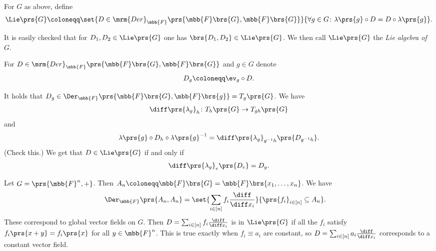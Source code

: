 \documentclass[10pt,a4paper,twoside,openany,hidelinks]{book}
\begin{document}
\begin{definition}
For $G$ as above, define
\[\Lie\prs{G} \coloneqq \set{D \in \mrm{Der}_{\mbb{F}}\prs{\mbb{F}\brs{G}, \mbb{F}\brs{G}}}{\forall g\in G \colon \lambda \prs{g} \circ D = D \circ \lambda\prs{g}} \text{.}\]
\end{definition}

\begin{remark}
It is easily checked that for $D_1, D_2 \in \Lie\prs{G}$ one has $\brs{D_1, D_2} \in \Lie\prs{G}$. We then call $\Lie\prs{G}$ the \emph{Lie algebra of $G$}.
\end{remark}

\begin{notation}
For $D \in \mrm{Der}_{\mbb{F}}\prs{\mbb{F}\brs{G}, \mbb{F}\brs{G}}$ and $g \in G$ denote
\[D_g \coloneqq \ev_g \circ D  \text{.}\]
\end{notation}

\begin{remark}
It holds that $D_g \in \Der_{\mbb{F}}\prs{\mbb{F}\brs{G}, \mbb{F}\brs{g}} = T_g\prs{G}$.
We have
\begin{align*}
\diff \prs{\lambda_g}_h \colon T_h\prs{G} &\to T_{gh}\prs{G} \\
\end{align*}
and
\begin{align*}
\lambda\prs{g} \circ D_h \circ \lambda\prs{g}^{-1} = \diff \prs{\lambda_g}_{g^{-1}h} \prs{D_{g^{-1}h}} \text{.}
\end{align*}
(Check this.)
We get that $D \in \Lie\prs{G}$ if and only if
\[\diff \prs{\lambda_g}_e \prs{D_e} = D_g \text{.}\]
\end{remark}

\begin{example}
Let $G = \prs{\mbb{F}^n, +}$. Then $A_n \coloneqq \mbb{F}\brs{G} = \mbb{F}\brs{x_1, \ldots, x_n}$.
We have
\begin{align*}
\Der_{\mbb{F}}\prs{A_n, A_n} &= \set{\sum_{i\in[n]} f_i \frac{\diff}{\diff x_i}}{\prs{f_i}_{i \in [n]} \subseteq A_n} \text{.}
\end{align*}
These correspond to global vector fields on $G$.
Then $D = \sum_{i \in [n]} f_i \frac{\diff}{\diff x_i}$ is in $\Lie\prs{G}$ if all the $f_i$ satisfy $f_i\prs{x+y} = f_i\prs{x}$ for all $y \in \mbb{F}^n$.
This is true exactly when $f_i \equiv a_i$ are constant, so $D = \sum_{i \in [n]} a_i \frac{\diff}{\diff x_i}$ corresponds to a constant vector field.
\end{example}
\end{document}
